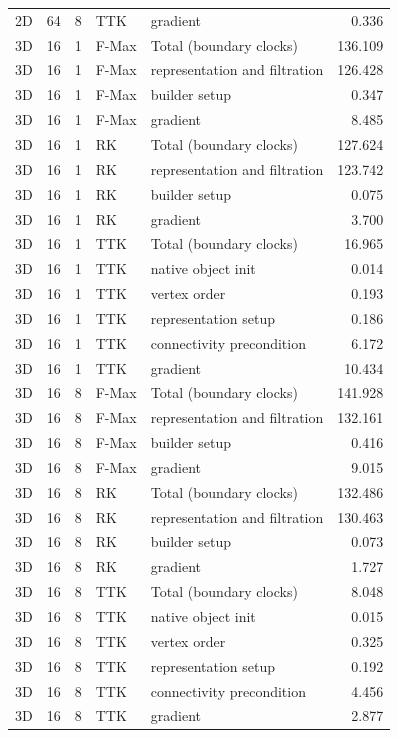 \begin{tabular}{lrrllr}
2D & 64 & 8 & TTK & gradient & 0.336 \\
3D & 16 & 1 & F-Max & Total (boundary clocks) & 136.109 \\
3D & 16 & 1 & F-Max & representation and filtration & 126.428 \\
3D & 16 & 1 & F-Max & builder setup & 0.347 \\
3D & 16 & 1 & F-Max & gradient & 8.485 \\
3D & 16 & 1 & RK & Total (boundary clocks) & 127.624 \\
3D & 16 & 1 & RK & representation and filtration & 123.742 \\
3D & 16 & 1 & RK & builder setup & 0.075 \\
3D & 16 & 1 & RK & gradient & 3.700 \\
3D & 16 & 1 & TTK & Total (boundary clocks) & 16.965 \\
3D & 16 & 1 & TTK & native object init & 0.014 \\
3D & 16 & 1 & TTK & vertex order & 0.193 \\
3D & 16 & 1 & TTK & representation setup & 0.186 \\
3D & 16 & 1 & TTK & connectivity precondition & 6.172 \\
3D & 16 & 1 & TTK & gradient & 10.434 \\
3D & 16 & 8 & F-Max & Total (boundary clocks) & 141.928 \\
3D & 16 & 8 & F-Max & representation and filtration & 132.161 \\
3D & 16 & 8 & F-Max & builder setup & 0.416 \\
3D & 16 & 8 & F-Max & gradient & 9.015 \\
3D & 16 & 8 & RK & Total (boundary clocks) & 132.486 \\
3D & 16 & 8 & RK & representation and filtration & 130.463 \\
3D & 16 & 8 & RK & builder setup & 0.073 \\
3D & 16 & 8 & RK & gradient & 1.727 \\
3D & 16 & 8 & TTK & Total (boundary clocks) & 8.048 \\
3D & 16 & 8 & TTK & native object init & 0.015 \\
3D & 16 & 8 & TTK & vertex order & 0.325 \\
3D & 16 & 8 & TTK & representation setup & 0.192 \\
3D & 16 & 8 & TTK & connectivity precondition & 4.456 \\
3D & 16 & 8 & TTK & gradient & 2.877 \\
\hline
\end{tabular}
